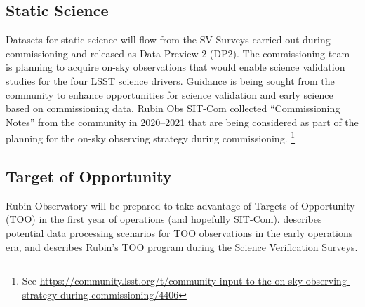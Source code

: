 \subsection{Static Science}

Datasets for static science will flow from the SV Surveys carried out during commissioning and released as Data Preview 2 (DP2).
The commissioning team is planning to acquire on-sky observations that would enable science validation studies for the four LSST science drivers.
Guidance is being sought from the community to enhance opportunities for science validation and early science  based on commissioning data.
Rubin Obs SIT-Com collected ``Commissioning Notes'' from the community in 2020--2021 that are being considered as part of the
planning for the on-sky observing strategy during commissioning. \footnote {See \url{https://community.lsst.org/t/community-input-to-the-on-sky-observing-strategy-during-commissioning/4406}}


\subsection{Target of Opportunity}

Rubin Observatory will be prepared to take advantage of Targets of Opportunity (TOO) in the first year of operations (and hopefully SIT-Com).
 describes potential data processing scenarios for TOO observations in the early operations era, and \cite{RTN-098} describes Rubin's TOO program during the Science Verification Surveys.
